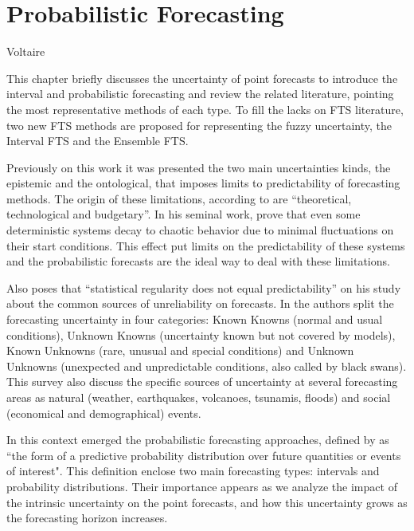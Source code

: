 \chapter[Probabilistic Forecasting]{Probabilistic Forecasting} 
\label{chap:review_probforecasting} 
\label{chap:prob}

{Voltaire}

This chapter briefly discusses the uncertainty of point forecasts to introduce the interval and probabilistic forecasting and review the related literature, pointing the most representative methods of each type. To fill the lacks on FTS literature, two new FTS methods are proposed for representing the fuzzy uncertainty, the Interval FTS and the Ensemble FTS.

Previously on this work it was presented the two main uncertainties kinds, the epistemic and the ontological, that imposes limits to predictability of forecasting methods. The origin of these limitations, according  to \cite{Krzysztofowicz2001} are ``theoretical, technological and budgetary''. In his seminal work, \cite{Lorenz1963} prove that even some deterministic systems decay to chaotic behavior due to minimal fluctuations on their start conditions. This effect put limits on the predictability of these systems and the probabilistic forecasts are the ideal way to deal with these limitations. 

Also \cite{Makridakis2010} poses that ``statistical regularity does not equal predictability'' on his study about the common sources of unreliability on forecasts. In \cite{Makridakis2016} the authors split the forecasting uncertainty in four categories: Known Knowns (normal and usual conditions), Unknown Knowns (uncertainty known but not covered by models), Known Unknowns (rare, unusual and special conditions) and Unknown Unknowns (unexpected and unpredictable conditions, also called by black swans). This survey also discuss the specific sources of uncertainty at several forecasting areas as natural (weather, earthquakes, volcanoes, tsunamis, floods) and social (economical and demographical) events.

In this context emerged the probabilistic forecasting approaches, defined by \cite{Gneiting2014b} as ``the form of a predictive probability distribution over future quantities or events of interest". This definition enclose two main forecasting types: intervals and probability distributions. Their importance appears as we analyze the impact of the intrinsic uncertainty on the point forecasts, and how this uncertainty grows as the forecasting horizon increases. 

